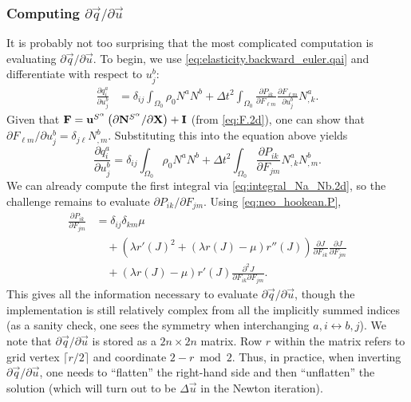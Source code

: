 \vspace{.5\baselineskip}
\subsubsection{Computing $\partial\vec{q}/\partial\vec{u}$}

It is probably not too surprising that the most complicated computation is evaluating $\partial\vec{q}/\partial\vec{u}$. To begin, we use \eqref{eq:elasticity.backward_euler.qai} and differentiate with respect to $u^b_j$:
\begin{equation*}
\begin{split}
\frac{\partial q^a_i}{\partial u^b_j}
  & = \delta_{ij} \int_{\Omega_0} \rho_0 N^a N^b
    + \Delta t^2 \int_{\Omega_0} \frac{\partial P_{ik}}{\partial F_{\ell m}} \frac{\partial F_{\ell m}}{\partial u^b_j} N^a_{,k}.
\end{split}
\end{equation*}
Given that $\mathbf{F} = \mathbf{u}^{S^{\alpha}} \left( \partial \mathbf{N}^{S^{\alpha}} / \partial \mathbf{X} \right) + \mathbf{I}$ (from \eqref{eq:F.2d}), one can show that $\partial F_{\ell m} / \partial u^b_j = \delta_{j \ell} N^b_{,m}$. Substituting this into the equation above yields
\begin{equation}\label{eq:elasticity.backward_euler.dqaidubj}
\frac{\partial q^a_i}{\partial u^b_j}
  = \delta_{ij} \int_{\Omega_0} \rho_0 N^a N^b
  + \Delta t^2 \int_{\Omega_0} \frac{\partial P_{ik}}{\partial F_{jm}} N^a_{,k} N^b_{,m}.
\end{equation}
We can already compute the first integral via \eqref{eq:integral_Na_Nb.2d}, so the challenge remains to evaluate $\partial P_{ik}/\partial F_{jm}$. Using \eqref{eq:neo_hookean.P},
\begin{equation*}
\begin{split}
\frac{\partial P_{ik}}{\partial F_{jm}}
  & = \delta_{ij} \delta_{km} \mu \\
  & \quad {} + \left( \lambda r'(J)^2 + \left( \lambda r(J) - \mu \right) r''(J) \right) \frac{\partial J}{\partial F_{ik}} \frac{\partial J}{\partial F_{jm}} \\
  & \quad {} + \left( \lambda r(J) - \mu \right) r'(J) \frac{\partial^2 J}{\partial F_{ik} \partial F_{jm}}.
\end{split}
\end{equation*}
This gives all the information necessary to evaluate $\partial\vec{q}/\partial\vec{u}$, though the implementation is still relatively complex from all the implicitly summed indices (as a sanity check, one sees the symmetry when interchanging $a,i \leftrightarrow b,j$). We note that $\partial\vec{q}/\partial\vec{u}$ is stored as a $2n \times 2n$ matrix. Row $r$ within the matrix refers to grid vertex $\lceil r/2 \rceil$ and coordinate $2 - r \bmod 2$. Thus, in practice, when inverting $\partial\vec{q}/\partial\vec{u}$, one needs to ``flatten'' the right-hand side and then ``unflatten'' the solution (which will turn out to be $\Delta\vec{u}$ in the Newton iteration).
